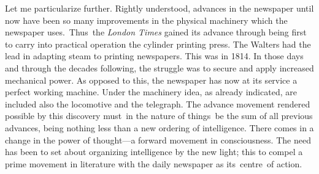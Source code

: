 \documentclass[twoside,symmetric,nobib,justified]{tufte-book}
\begin{document}
Let me particularize further. Rightly understood, advances in the
newspaper until now have been so many improvements in the physical
machinery which the newspaper uses.~Thus~the \emph{London Times} gained
its advance through being first to carry into practical operation the
cylinder printing press. The Walters had the lead in adapting steam to
printing newspapers. This was in 1814. In those days and through the
decades following, the struggle was to secure and apply increased
mechanical power. As opposed to this, the newspaper has now at its
service a perfect working machine. Under the machinery idea, as already
indicated, are included also the locomotive and the telegraph. The
advance movement rendered possible by this discovery must~in the nature
of things~be the sum of all previous advances, being nothing less than a
new ordering of intelligence. There comes in a change in the power of
thought---a forward movement in consciousness. The need has been to set
about organizing intelligence by the new light; this to compel a prime
movement in literature with the daily newspaper as its~centre~of
action.~
\end{document}
